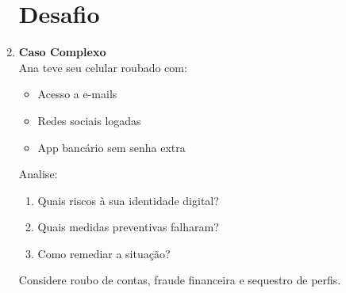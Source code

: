 \documentclass[11pt]{article}
\begin{document}
\begin{multicols}{2}
\begin{enumerate}
\section*{Desafio}

\item \textbf{Caso Complexo}\\
Ana teve seu celular roubado com:
\begin{itemize}
\item Acesso a e-mails
\item Redes sociais logadas
\item App bancário sem senha extra
\end{itemize}
Analise:
\begin{enumerate}[label=(\alph*)]
    \item Quais riscos à sua identidade digital?
    \item Quais medidas preventivas falharam?
    \item Como remediar a situação?
\end{enumerate}
\begin{tcolorbox}[colback=explanationbg,colframe=titleblue,title=Dica:]
Considere roubo de contas, fraude financeira e sequestro de perfis.
\end{tcolorbox}

\end{enumerate}
\end{multicols}
\end{document}
